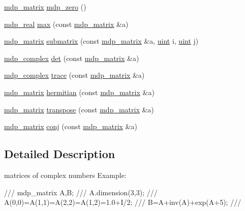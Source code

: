 \begin{DoxyCompactItemize}
\item 
\hyperlink{classmdp__matrix}{mdp\_\-matrix} \hyperlink{classmdp__matrix_a1ba8b1ac1136a436607d0f7815868508}{mdp\_\-zero} ()
\item 
\hyperlink{mdp__global__vars_8h_a049e4c1d4e74d644878a42f9909463e4}{mdp\_\-real} \hyperlink{classmdp__matrix_a91537cc4584a782ada453ae45843ec0f}{max} (const \hyperlink{classmdp__matrix}{mdp\_\-matrix} \&a)
\item 
\hyperlink{classmdp__matrix}{mdp\_\-matrix} \hyperlink{classmdp__matrix_a28a3f69388892b5b30aad614ed75e375}{submatrix} (const \hyperlink{classmdp__matrix}{mdp\_\-matrix} \&a, \hyperlink{mdp__global__vars_8h_a91ad9478d81a7aaf2593e8d9c3d06a14}{uint} i, \hyperlink{mdp__global__vars_8h_a91ad9478d81a7aaf2593e8d9c3d06a14}{uint} j)
\item 
\hyperlink{classmdp__complex}{mdp\_\-complex} \hyperlink{classmdp__matrix_aed4c7d1f4639e8a8e7e435a617d59080}{det} (const \hyperlink{classmdp__matrix}{mdp\_\-matrix} \&a)
\item 
\hyperlink{classmdp__complex}{mdp\_\-complex} \hyperlink{classmdp__matrix_a5336fdab3a6eaa9888c91833f251f4e0}{trace} (const \hyperlink{classmdp__matrix}{mdp\_\-matrix} \&a)
\item 
\hyperlink{classmdp__matrix}{mdp\_\-matrix} \hyperlink{classmdp__matrix_a351ca320380dbd121764fa96d4f0f711}{hermitian} (const \hyperlink{classmdp__matrix}{mdp\_\-matrix} \&a)
\item 
\hyperlink{classmdp__matrix}{mdp\_\-matrix} \hyperlink{classmdp__matrix_a271d6793f4231f7b290179bff594e8d1}{transpose} (const \hyperlink{classmdp__matrix}{mdp\_\-matrix} \&a)
\item 
\hyperlink{classmdp__matrix}{mdp\_\-matrix} \hyperlink{classmdp__matrix_ae0dd178eaad795af699d595ca0ef5c37}{conj} (const \hyperlink{classmdp__matrix}{mdp\_\-matrix} \&a)
\end{DoxyCompactItemize}


\subsection{Detailed Description}
matrices of complex numbers Example: \begin{DoxyVerb}
///    mdp_matrix A,B;
///    A.dimension(3,3);
///    A(0,0)=A(1,1)=A(2,2)=A(1,2)=1.0+I/2;
///    B=A+inv(A)+exp(A+5);
/// \end{DoxyVerb}
 

